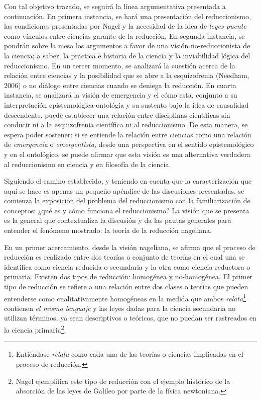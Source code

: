 \documentclass[]{book}
\begin{document}
\begin{refsection}
Con tal objetivo trazado, se seguirá la línea argumentativa presentada a
continuación. En primera instancia, se hará una presentación del
reduccionismo, las condiciones presentadas por Nagel y la necesidad de
la idea de \emph{leyes-puente} como vínculos entre ciencias garante de
la reducción. En segunda instancia, se pondrán sobre la mesa los
argumentos a favor de una visión no-reduccionista de la ciencia; a
saber, la práctica e historia de la ciencia y la inviabilidad lógica del
reduccionismo. En un tercer momento, se analizará la cuestión acerca de
la relación entre ciencias y la posibilidad que se abre a la
esquizofrenia (Needham, 2006) o no diálogo entre ciencias cuando se
deniega la reducción. En cuarta instancia, se analizará la visión de
emergencia y el cómo esta, conjunto a su interpretación
epistemológica-ontológia y su sustento bajo la idea de causalidad
descendente, puede establecer una relación entre disciplinas científicas
sin conducir ni a la esquizofrenia científica ni al reduccionismo. De
esta manera, se espera poder sostener: si se entiende la relación entre
ciencias como una relación de \emph{emergencia} o \emph{emergentista},
desde una perspectiva en el sentido epistemológico y en el ontológico,
se puede afirmar que esta visión es una alternativa verdadera al
reduccionismo en ciencia y en filosofía de la ciencia.

Siguiendo el camino establecido, y teniendo en cuenta que la
caracterización que aquí se hace es apenas un pequeño apéndice de las
discusiones presentadas, se comienza la exposición del problema del
reduccionismo con la familiarización de conceptos: ¿qué es y cómo
funciona el reduccionismo? La visión que se presenta es la general que
contextualiza la discusión y da las pautas generales para entender el
fenómeno mostrado: la teoría de la reducción nageliana.

En un primer acercamiento, desde la visión nageliana, se afirma que el
proceso de reducción es realizado entre dos teorías o conjunto de
teorías en el cual una se identifica como ciencia reducida o secundaria
y la otra como ciencia reductora o primaria. Existen dos tipos de
reducción: homogénea y no-homogénea. El primer tipo de reducción se
refiere a una relación entre dos clases o teorías que pueden entenderse
como cualitativamente homogéneas en la medida que ambos
\emph{relata}\footnote{Entiéndase \emph{relata} como cada una de las
  teorías o ciencias implicadas en el proceso de reducción.} contienen
\emph{el mismo lenguaje} y las leyes dadas para la ciencia secundaria no
utilizan términos, ya sean descriptivos o teóricos, que no puedan ser
rastreados en la ciencia primaria\footnote{Nagel ejemplifica este tipo
  de reducción con el ejemplo histórico de la absorción de las leyes de
  Galileo por parte de la física newtoniana.}.


\end{refsection}
\end{document}
